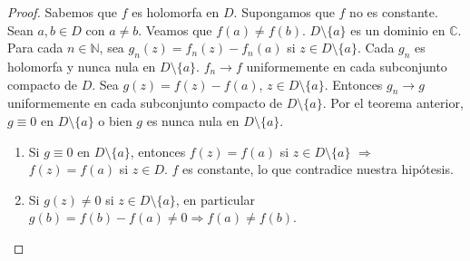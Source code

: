 \begin{proof}
    Sabemos que $f$ es holomorfa en $D$.
    Supongamos que $f$ no es constante.
    Sean $a, b \in D$ con $a \neq b$.
    Veamos que $f(a) \neq f(b)$.
    $D \setminus \{a\}$ es un dominio en $\mathbb{C}$.
    Para cada $n \in \mathbb{N}$, sea $g_n(z) = f_n(z) - f_n(a)$ si $z \in D \setminus \{a\}$.
    Cada $g_n$ es holomorfa y nunca nula en $D \setminus \{a\}$.
    $f_n \to f$ uniformemente en cada subconjunto compacto de $D$.
    Sea $g(z) = f(z) - f(a)$, $z \in D \setminus \{a\}$.
    Entonces $g_n \to g$ uniformemente en cada subconjunto compacto de $D \setminus \{a\}$.
    Por el teorema anterior, $g \equiv 0$ en $D \setminus \{a\}$ o bien $g$ es nunca nula en $D \setminus \{a\}$.

    \begin{enumerate}
        \item Si $g \equiv 0$ en $D \setminus \{a\}$, entonces $f(z) = f(a)$ si $z \in D \setminus \{a\}$ $\Rightarrow$ $f(z) = f(a)$ si $z \in D$.
              $f$ es constante, lo que contradice nuestra hipótesis.
        \item Si $g(z) \neq 0$ si $z \in D \setminus \{a\}$, en particular $g(b) = f(b) - f(a) \neq 0 \Rightarrow f(a) \neq f(b)$.
    \end{enumerate}
\end{proof}